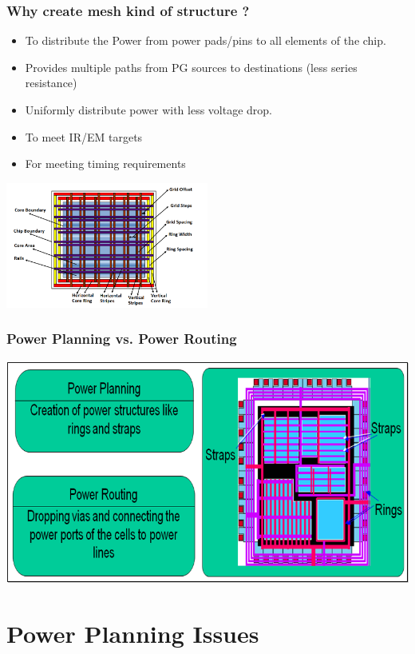 \documentclass[compress]{beamer}
\begin{document}
\begin{frame}
	\frametitle{Why create mesh kind of structure ?}
	\begin{itemize}
		\item  To distribute the Power from power pads/pins to all elements of the chip.
		\item Provides multiple paths from PG sources to destinations (less series resistance)
		\item  Uniformly distribute power with less voltage drop.
		\item  To meet IR/EM targets
		\item  For meeting timing requirements
	\end{itemize}
	\begin{center}
	\includegraphics[width=0.5\textwidth]{Power mesh2}
\end{center}
\end{frame}
\begin{frame}
	\frametitle{Power Planning vs. Power Routing}
	\begin{center}
		\includegraphics[width=\textwidth]{Power Planning vs. Power Routing}
	\end{center}
\end{frame}
\section[Issues]{Power Planning Issues}
\end{document}
